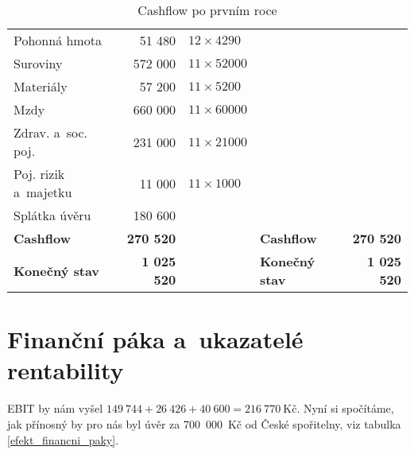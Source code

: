 \begin{table}[htbp]
\begin{center}
\begin{tabular}{lrllr}
\hspace{0,5cm}Pohonná hmota                & 51 480             & $12 \times 4290$  &                                                   &                    \\
\hspace{0,5cm}Suroviny                     & 572 000            & $11 \times 52000$ &                                                   &                    \\
\hspace{0,5cm}Materiály                    & 57 200             & $11 \times 5200$  &                                                   &                    \\
\hspace{0,5cm}Mzdy\index{mzda}                         & 660 000            & $11 \times 60000$ &                                                   &                    \\
\hspace{0,5cm}Zdrav. a~soc. poj.           & 231 000            & $11 \times 21000$ &                                                   &                    \\
\hspace{0,5cm}Poj. rizik a~majetku         & 11 000             & $11 \times 1000$  & \textbf{}                                         & \textbf{}          \\
\hspace{0,5cm}Splátka úvěru\index{úvěr}                & 180 600            &                   & \textbf{}                                         & \textbf{}          \\ \hline
\textbf{Cashflow\index{cashflow}}                          & \textbf{270 520}   &                   & \textbf{Cashflow\index{cashflow}}                                 & \textbf{270 520}   \\
\textbf{Konečný stav}                      & \textbf{1 025 520} &                   & \textbf{Konečný stav}                             & \textbf{1 025 520}
\end{tabular}
\caption{Cashflow po prvním roce}
\label{cashflow}
\end{center}
\end{table}


\section{Finanční páka a~ukazatelé rentability}
EBIT by nám vyšel $149~744 + 26~426 + 40~600 = 216~770~\text{Kč}$. Nyní si spočítáme, jak přínosný by pro nás byl úvěr za 700~000~Kč od České spořitelny, viz tabulka \ref{efekt_financni_paky}.

